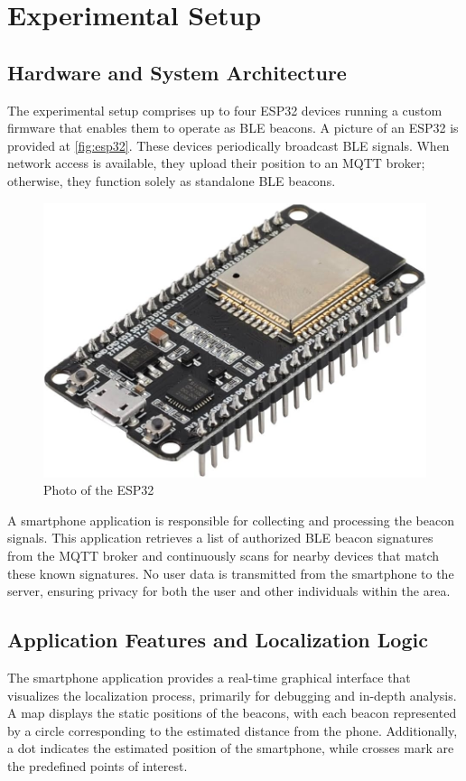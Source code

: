 \section{Experimental Setup}

\subsection{Hardware and System Architecture}

The experimental setup comprises up to four ESP32 devices running a custom firmware that enables them to operate as BLE beacons. A picture of an ESP32 is provided at \autoref{fig:esp32}. These devices periodically broadcast BLE signals. When network access is available, they upload their position to an MQTT broker; otherwise, they function solely as standalone BLE beacons.

\begin{figure}
    \centering
    \includegraphics[width=0.5\linewidth]{assets/image-esp32.jpg}
    \caption{Photo of the ESP32}
    \label{fig:esp32}
\end{figure}

A smartphone application is responsible for collecting and processing the beacon signals. This application retrieves a list of authorized BLE beacon signatures from the MQTT broker and continuously scans for nearby devices that match these known signatures. No user data is transmitted from the smartphone to the server, ensuring privacy for both the user and other individuals within the area.

\subsection{Application Features and Localization Logic}

The smartphone application provides a real-time graphical interface that visualizes the localization process, primarily for debugging and in-depth analysis. A map displays the static positions of the beacons, with each beacon represented by a circle corresponding to the estimated distance from the phone. Additionally, a dot indicates the estimated position of the smartphone, while crosses mark are the predefined points of interest.

